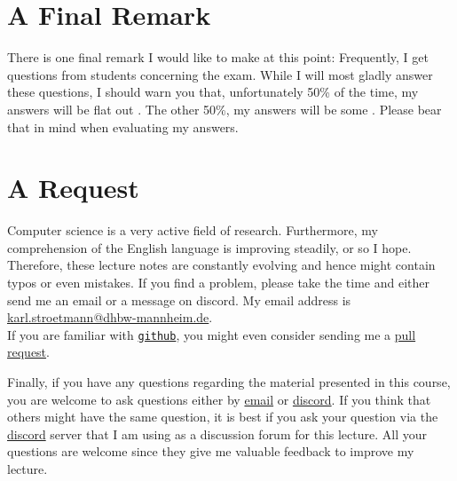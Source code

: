 \section{A Final Remark}
There is one final remark I would like to make at this point:  Frequently, I get questions from
students concerning the exam.  While I will most gladly \dSmiley[1.5] answer these questions, I should warn you
that, unfortunately 50\%
of the time, my answers will be flat out  .  The other 50\%,
my answers will be some  .  Please bear that in mind when evaluating my answers. 
\pagebreak

\section{A Request}
Computer science is a very active field of research.  Furthermore, my comprehension of the English
language is improving steadily, or so I hope.  Therefore, these lecture notes are constantly
evolving and hence might contain typos or even mistakes.  If you find a problem,
please take the time and either send me an email or a message on discord.  My email address is
\\[0.2cm]
\hspace*{1.3cm}
\href{mailto:karl.stroetmann@dhbw-mannheim.de}{karl.stroetmann@dhbw-mannheim.de}.
\\[0.2cm]
If you are familiar with \href{http://github.com}{\texttt{github}}, you might even consider
sending me a \href{https://help.github.com/articles/using-pull-requests}{pull request}.

Finally, if you have any questions regarding the material presented in this course, you are
welcome to ask questions either by \href{mailto:karl.stroetmann@dhbw-mannheim.de}{email} or
\href{https://discordapp.com}{discord}.  If you think that others might
have the same question, it is best if you ask your question via the \href{https://discordapp.com}{discord}
server that I am using as a discussion forum for this lecture.  All your questions are welcome since they give
me valuable feedback   to improve my lecture. 


